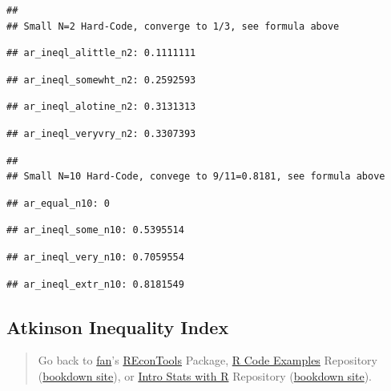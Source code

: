 \documentclass[
]{book}
\begin{document}
\begin{verbatim}
## 
## Small N=2 Hard-Code, converge to 1/3, see formula above
\end{verbatim}

\begin{verbatim}
## ar_ineql_alittle_n2: 0.1111111
\end{verbatim}

\begin{verbatim}
## ar_ineql_somewht_n2: 0.2592593
\end{verbatim}

\begin{verbatim}
## ar_ineql_alotine_n2: 0.3131313
\end{verbatim}

\begin{verbatim}
## ar_ineql_veryvry_n2: 0.3307393
\end{verbatim}

\begin{verbatim}
## 
## Small N=10 Hard-Code, convege to 9/11=0.8181, see formula above
\end{verbatim}

\begin{verbatim}
## ar_equal_n10: 0
\end{verbatim}

\begin{verbatim}
## ar_ineql_some_n10: 0.5395514
\end{verbatim}

\begin{verbatim}
## ar_ineql_very_n10: 0.7059554
\end{verbatim}

\begin{verbatim}
## ar_ineql_extr_n10: 0.8181549
\end{verbatim}

\hypertarget{atkinson-inequality-index}{%
\subsection{Atkinson Inequality Index}\label{atkinson-inequality-index}}

\begin{quote}
Go back to \href{http://fanwangecon.github.io/}{fan}'s \href{https://fanwangecon.github.io/REconTools/}{REconTools} Package, \href{https://fanwangecon.github.io/R4Econ/}{R Code Examples} Repository (\href{https://fanwangecon.github.io/R4Econ/bookdown}{bookdown site}), or \href{https://fanwangecon.github.io/Stat4Econ/}{Intro Stats with R} Repository (\href{https://fanwangecon.github.io/Stat4Econ/bookdown}{bookdown site}).
\end{quote}
\end{document}
